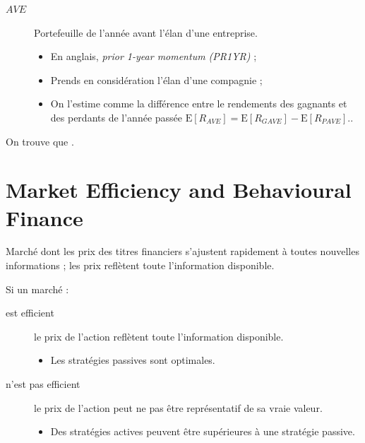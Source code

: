 \documentclass[10pt, french]{article}
\begin{document}
\begin{multicols*}{2}
\begin{definitionNOHFILL}[Notation]
\begin{description}
\begin{itemize}
		\end{itemize}
	\item[$AVE$]	Portefeuille de l'année avant l'élan d'une entreprise.
		\begin{itemize}
		\item	En anglais, \og \textit{prior 1-year momentum (PR1YR)} \fg{} ;
		\item	Prends en considération l'élan d'une compagnie ;
		\item	On l'estime comme la différence entre le rendements des gagnants et des perdants de l'année passée $\text{E}[R_{AVE}]	=	\text{E}[R_{GAVE}]	-	\text{E}[R_{PAVE}]$..
		\end{itemize}
\end{description}

On trouve que 	.
\end{definitionNOHFILL}



\newpage
\setcounter{section}{38} %
\section{Market Efficiency and Behavioural Finance}
\begin{definitionNOHFILL}
Marché dont les prix des titres financiers s'ajustent rapidement à toutes nouvelles informations ; les prix reflètent toute l'information disponible.


Si un marché :
\begin{description}
	\item[est efficient]	le prix de l'action reflètent toute l'information disponible.
		\begin{itemize}
		\item	Les stratégies passives sont optimales.
		\end{itemize}
	\item[n'est pas efficient]	le prix de l'action peut ne pas être représentatif de sa vraie valeur.
		\begin{itemize}
		\item	Des stratégies actives peuvent être supérieures à une stratégie passive.
		\end{itemize}
\end{description}


\end{definitionNOHFILL}
\end{multicols*}
\end{document}
